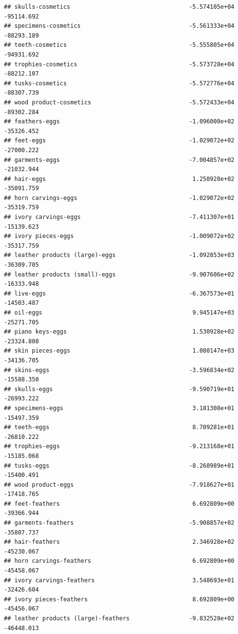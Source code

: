 \documentclass[
  12pt,
]{article}
\begin{document}
\begin{verbatim}
## skulls-cosmetics                                  -5.574105e+04  -95114.692
## specimens-cosmetics                               -5.561333e+04  -88293.189
## teeth-cosmetics                                   -5.555805e+04  -94931.692
## trophies-cosmetics                                -5.573728e+04  -88212.107
## tusks-cosmetics                                   -5.572776e+04  -88307.739
## wood product-cosmetics                            -5.572433e+04  -89302.284
## feathers-eggs                                     -1.096000e+02  -35326.452
## feet-eggs                                         -1.029072e+02  -27000.222
## garments-eggs                                     -7.004857e+02  -21032.944
## hair-eggs                                          1.250928e+02  -35091.759
## horn carvings-eggs                                -1.029072e+02  -35319.759
## ivory carvings-eggs                               -7.411307e+01  -15139.623
## ivory pieces-eggs                                 -1.009072e+02  -35317.759
## leather products (large)-eggs                     -1.092853e+03  -36309.705
## leather products (small)-eggs                     -9.907606e+02  -16333.948
## live-eggs                                         -6.367573e+01  -14503.487
## oil-eggs                                           9.945147e+03  -25271.705
## piano keys-eggs                                    1.530928e+02  -23324.808
## skin pieces-eggs                                   1.080147e+03  -34136.705
## skins-eggs                                        -3.596834e+02  -15588.350
## skulls-eggs                                       -9.590719e+01  -26993.222
## specimens-eggs                                     3.181308e+01  -15497.359
## teeth-eggs                                         8.709281e+01  -26810.222
## trophies-eggs                                     -9.213168e+01  -15185.068
## tusks-eggs                                        -8.260989e+01  -15400.491
## wood product-eggs                                 -7.918627e+01  -17418.765
## feet-feathers                                      6.692809e+00  -39366.944
## garments-feathers                                 -5.908857e+02  -35807.737
## hair-feathers                                      2.346928e+02  -45230.067
## horn carvings-feathers                             6.692809e+00  -45458.067
## ivory carvings-feathers                            3.548693e+01  -32426.604
## ivory pieces-feathers                              8.692809e+00  -45456.067
## leather products (large)-feathers                 -9.832528e+02  -46448.013

\end{verbatim}
\end{document}
